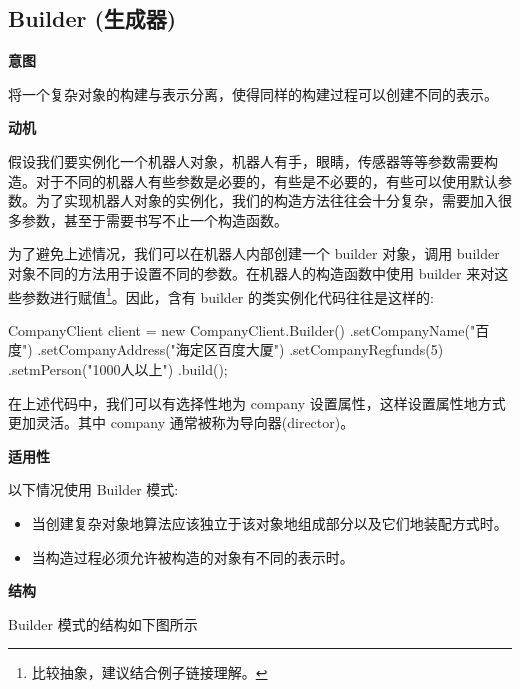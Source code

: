 \subsection{Builder (生成器)}
\noindent\textbf{意图}

将一个复杂对象的构建与表示分离，使得同样的构建过程可以创建不同的表示。

\noindent\textbf{动机}

假设我们要实例化一个机器人对象，机器人有手，眼睛，传感器等等参数需要构造。对于不同的机器人有些参数是必要的，有些是不必要的，有些可以使用默认参数。为了实现机器人对象的实例化，我们的构造方法往往会十分复杂，需要加入很多参数，甚至于需要书写不止一个构造函数。

为了避免上述情况，我们可以在机器人内部创建一个 builder 对象，调用 builder 对象不同的方法用于设置不同的参数。在机器人的构造函数中使用 builder 来对这些参数进行赋值\footnote{比较抽象，建议结合例子链接理解。}。因此，含有 builder 的类实例化代码往往是这样的:

\begin{Java}
CompanyClient client = new CompanyClient.Builder()
    .setCompanyName("百度")
    .setCompanyAddress("海定区百度大厦")
    .setCompanyRegfunds(5)
    .setmPerson("1000人以上")
    .build();
\end{Java}

在上述代码中，我们可以有选择性地为 company 设置属性，这样设置属性地方式更加灵活。其中 company 通常被称为导向器(director)。

\noindent\textbf{适用性}

以下情况使用 Builder 模式:
\begin{itemize}
    \item 当创建复杂对象地算法应该独立于该对象地组成部分以及它们地装配方式时。
    \item 当构造过程必须允许被构造的对象有不同的表示时。
\end{itemize}

\noindent\textbf{结构}

Builder 模式的结构如下图所示

\begin{figure}[H]
    \scriptsize
    \centering
\end{figure}

